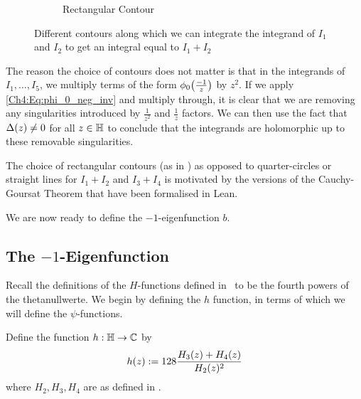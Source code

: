 \begin{figure}[ht]
\begin{subfigure}{0.3\textwidth}
        \label{Ch4:subfig:a_rect_contour}
        \caption{Rectangular Contour}
    \end{subfigure}
    \caption{\centering Different contours along which we can integrate the integrand of $I_1$ and $I_2$ to get an integral equal to $I_1 + I_2$}
    \label{Ch4:fig:a_contours}
\end{figure}

The reason the choice of contours does not matter is that in the integrands of $I_1, \ldots, I_5$, we multiply terms of the form $\phi_0\!\left( \frac{-1}{z} \right)$ by $z^2$. If we apply \eqref{Ch4:Eq:phi_0_neg_inv} and multiply through, it is clear that we are removing any singularities introduced by $\frac{1}{z^2}$ and $\frac{1}{z}$ factors. We can then use the fact that $\Delta\!\left( z \right) \neq 0$ for all $z \in \mathbb{H}$ to conclude that the integrands are holomorphic up to these removable singularities.

The choice of rectangular contours (as in ) as opposed to quarter-circles or straight lines for $I_1 + I_2$ and $I_3 + I_4$ is motivated by the versions of the Cauchy-Goursat Theorem that have been formalised in Lean.


We are now ready to define the $-1$-eigenfunction $b$.

\subsection{The $-1$-Eigenfunction}

Recall the definitions of the $H$-functions defined in \sorry\ to be the fourth powers of the thetanullwerte. We begin by defining the $h$ function, in terms of which we will define the $\psi$-functions.

\begin{boxdefinition}\label{Ch4:Def:h}
    Define the function $h : \mathbb{H} \to \mathbb{C}$ by
    \begin{align}
        h\!\left( z \right) := 128 \frac{H_3(z) + H_4(z)}{H_2(z)^2} \label{Ch4:Eq:h_def}
    \end{align}
    where $H_2, H_3, H_4$ are as defined in \sorry.
\end{boxdefinition}

